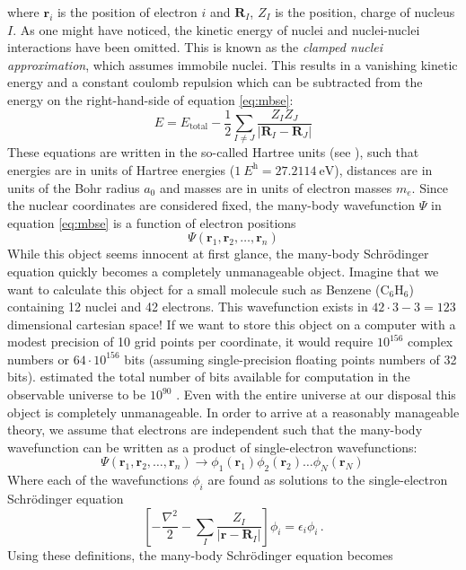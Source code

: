 \noindent where $\bm{r}_i$ is the position of electron $i$ and $\bm{R}_I$, $Z_I$ is the position, charge of nucleus $I$. As one might have noticed, the kinetic energy of nuclei and nuclei-nuclei interactions have been omitted. This is known as the \emph{clamped nuclei approximation}, which assumes immobile nuclei. This results in a vanishing kinetic energy and a constant coulomb repulsion which can be subtracted from the energy on the right-hand-side of equation \eqref{eq:mbse}:
%
\[ E = E_\text{total} - \frac{1}{2} \sum_{I \neq J} \frac{Z_I Z_J}{|\bm{R}_I - \bm{R}_J|} \]
%
These equations are written in the so-called Hartree units (see \cite[chapter 2.3]{Giustino2014}), such that energies are in units of Hartree energies ($\SI{1}{\hartree} = \SI{27.2114}{\eV}$), distances are in units of the Bohr radius $a_0$ and masses are in units of electron masses $m_e$. Since the nuclear coordinates are considered fixed, the many-body wavefunction $\Psi$ in equation \eqref{eq:mbse} is a function of electron positions
%
\[ \Psi(\bm{r}_1,\bm{r}_2,\dots, \bm{r}_n) \]
%
While this object seems innocent at first glance, the many-body Schr\"odinger equation quickly becomes a completely unmanageable object. Imagine that we want to calculate this object for a small molecule such as Benzene (C$_6$H$_6$) containing 12 nuclei and 42 electrons. This wavefunction exists in $42\cdot3-3 = 123$ dimensional cartesian space! If we want to store this object on a computer with a modest precision of 10 grid points per coordinate, it would require $10^{156}$ complex numbers or $64 \cdot 10^{156}$ bits (assuming single-precision floating points numbers of 32 bits). \citeauthor{Lloyd2002} estimated the total number of bits available for computation in the observable universe to be $10^{90}$ \cite{Lloyd2002}. Even with the entire universe at our disposal this object is completely unmanageable. In order to arrive at a reasonably manageable theory, we assume that electrons are independent such that the many-body wavefunction can be written as a product of single-electron wavefunctions:
%
\begin{equation}\label{eq:independent_electrons}
\Psi(\bm{r}_1,\bm{r}_2,\dots, \bm{r}_n) \longrightarrow \phi_1(\bm{r}_1)\phi_2(\bm{r}_2)\dots\phi_N(\bm{r}_N) \,
\end{equation}
%
Where each of the wavefunctions $\phi_i$ are found as solutions to the single-electron Schr\"odinger equation
%
\[ \left[ - \frac{\nabla^2}{2} - \sum_I \frac{Z_I}{|\bm{r} - \bm{R}_I|} \right] \phi_i = \epsilon_i \phi_i \, . \]
%
Using these definitions, the many-body Schr\"odinger equation becomes
